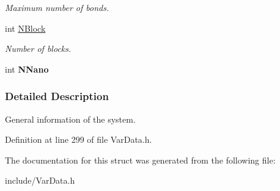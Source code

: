 \begin{DoxyCompactItemize}
\begin{DoxyCompactList}\small\item\em Maximum number of bonds. \end{DoxyCompactList}\item 
int \hyperlink{structGENERAL_a6613c7ace95c4bff9b80a9bfd8f4a9f8}{N\+Block}\hypertarget{structGENERAL_a6613c7ace95c4bff9b80a9bfd8f4a9f8}{}\label{structGENERAL_a6613c7ace95c4bff9b80a9bfd8f4a9f8}

\begin{DoxyCompactList}\small\item\em Number of blocks. \end{DoxyCompactList}\item 
int {\bfseries N\+Nano}\hypertarget{structGENERAL_a41701680890bf48215ba29ba50d61caa}{}\label{structGENERAL_a41701680890bf48215ba29ba50d61caa}

\end{DoxyCompactItemize}


\subsubsection{Detailed Description}
General information of the system. 

Definition at line 299 of file Var\+Data.\+h.



The documentation for this struct was generated from the following file\+:\begin{DoxyCompactItemize}
\item 
include/Var\+Data.\+h\end{DoxyCompactItemize}

